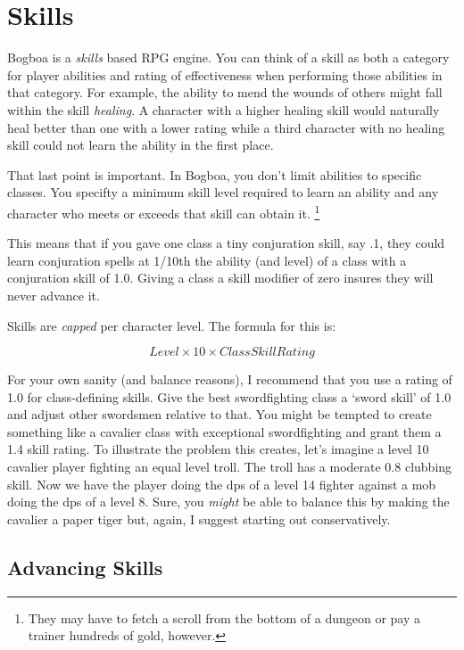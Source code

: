 \section{Skills}

Bogboa is a \emph{skills} based RPG engine.  You can think of a skill as both
a category for player abilities and rating of effectiveness when performing
those abilities in that category.  For example, the ability to mend the wounds
of others might fall within the skill \emph{healing}.  A character with a 
higher healing skill would naturally heal better than one with a lower rating
while a third character with no healing skill could not learn the ability in
the first place.

That last point is important.  In Bogboa, you don't limit abilities to
specific classes.  You specifty a minimum skill level required to learn an 
ability and any character who meets or exceeds that skill can obtain it.
\footnote{They may have to fetch a scroll from the bottom of a dungeon or 
pay a trainer hundreds of gold, however.}

This means that if you gave one class a tiny conjuration skill, say .1, 
they could learn conjuration spells at 1/10th the ability (and level) of a
class with a conjuration skill of 1.0.  Giving a class a skill modifier of
zero insures they will never advance it.

Skills are \emph{capped} per character level.  The formula for this is:

\[ Level \times 10 \times Class Skill Rating \]
      
For your own sanity (and balance reasons), I recommend that you use
a rating of 1.0 for class-defining skills.  Give the best swordfighting
class a `sword skill' of 1.0 and adjust other swordsmen relative to that.
You might be tempted to create something like a cavalier class with
exceptional swordfighting and grant them a 1.4 skill rating.  To illustrate
the problem this creates, let's imagine a level 10 cavalier player fighting
an equal level troll.  The troll has a moderate 0.8 clubbing skill.  Now we
have the player doing the dps of a level 14 fighter against a mob doing the
dps of a level 8.  Sure, you \emph{might} be able to balance this by making the
cavalier a paper tiger but, again, I suggest starting out conservatively.
    
\subsection{Advancing Skills}

